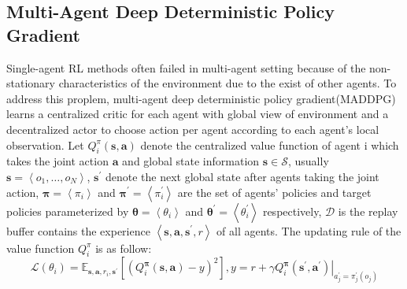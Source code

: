 \documentclass{article} %
\begin{document}
\subsection{Multi-Agent Deep Deterministic Policy Gradient}
Single-agent RL methods often failed in multi-agent setting because of the non-stationary characteristics of the environment due to the exist of other agents. To address this proplem, multi-agent deep deterministic policy gradient(MADDPG) learns a centralized critic for each agent with global view of environment and a decentralized actor to choose action per agent according to each agent's local observation.
Let $Q_{i}^{\pi}(\boldsymbol{s}, \boldsymbol{a})$ denote the centralized value function of agent i which takes the joint action $\boldsymbol{a}$ and global state information $\boldsymbol{s} \in \mathcal{S}$, usually $\boldsymbol{s}=\left\langle o_{1}, \ldots, o_{N}\right\rangle$, $\boldsymbol{s}^{\prime}$ denote the next global state after agents taking the joint action, $\boldsymbol{\pi}=\left\langle {\pi}_{i}\right\rangle$ and $\boldsymbol{\pi}^{\prime}=\left\langle {\pi}_{i}^{\prime}\right\rangle$ are the set of agents' policies and target policies parameterized by $\boldsymbol{\theta}=\left\langle {\theta}_{i}\right\rangle$ and $\boldsymbol{\theta}^{\prime}=\left\langle {\theta}_{i}^{\prime}\right\rangle$ respectively, $\mathcal{D}$ is the replay buffer contains the experience $\left\langle\boldsymbol{s}, \boldsymbol{a}, \boldsymbol{s}^{\prime}, r\right\rangle$ of all agents. The updating rule of the value function $Q_{i}^{\pi}$ is as follow:
\begin{equation}
\label{equation:15}
\mathcal{L}\left(\theta_{i}\right)=\mathbb{E}_{\boldsymbol{s}, \boldsymbol{a}, r_{i}, \boldsymbol{s}^{\prime}}\left[\left(Q_{i}^{\boldsymbol{\pi}}(\boldsymbol{s}, \boldsymbol{a})-y\right)^{2}\right], y=r+\left.\gamma Q_{i}^{\boldsymbol{\pi}}\left(\boldsymbol{s}^{\prime}, \boldsymbol{a}^{\prime}\right)\right|_{a_{j}^{\prime}=\pi_{j}^{\prime}\left(o_{j}\right)}
\end{equation}
\fi
\end{document}
